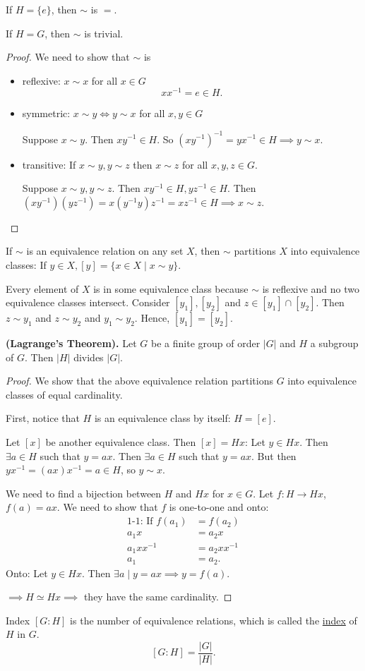 If $H = \{e\}$, then $\sim$ is $=$. 

If $H = G$, then $\sim$ is trivial. 

\begin{proof}
We need to show that $\sim$ is
\begin{itemize}	
\item reflexive: $x\sim x$ for all $x\in G$
\[xx^{-1}=e\in H.\]
\item symmetric: $x\sim y \iff y\sim x$ for all $x, y\in G$

Suppose $x\sim y$. Then $xy^{-1}\in H$. So $(xy^{-1})^{-1}=yx^{-1}\in H\implies y\sim x$. 
\item transitive: If $x\sim y, y\sim z$ then $x\sim z$ for all $x, y, z \in G$. 

Suppose $x\sim y, y\sim z$. Then $xy^{-1}\in H, yz^{-1}\in H$. Then $(xy^{-1})(yz^{-1})=x(y^{-1}y)z^{-1}=xz^{-1}\in H\implies x\sim z$. 
\end{itemize}
\end{proof}

If $\sim$ is an equivalence relation on any set $X$, then $\sim$ partitions $X$ into equivalence classes: 
If $y\in X, [y]=\{x\in X\mid x\sim y\}$. 

Every element of $X$ is in some equivalence class because $\sim$ is reflexive and no two equivalence classes intersect. Consider $[y_1], [y_2]$ and $z\in [y_1]\cap [y_2]$. Then $z\sim y_1$ and $z\sim y_2$ and $y_1\sim y_2$. Hence, $[y_1] = [y_2]$. 

\begin{theorem}
\textbf{(Lagrange's Theorem).} Let $G$ be a finite group of order $|G|$ and $H$ a subgroup of $G$. Then $|H|$ divides $|G|$. 	
\end{theorem}
\begin{proof}
We show that the above equivalence relation partitions $G$ into equivalence classes of equal cardinality. 

First, notice that $H$ is an equivalence class by itself: $H = [e]$. 

Let $[x]$ be another equivalence class. Then $[x]=Hx$: 
Let $y\in Hx$. Then $\exists a\in H$ such that $y=ax$. Then $\exists a\in H$ such that $y=ax$. But then $yx^{-1} = (ax)x^{-1}=a\in H$, so $y\sim x$. 

We need to find a bijection between $H$ and $Hx$ for $x\in G$. Let $f: H\to Hx$, $f(a)=ax$. We need to show that $f$ is one-to-one and onto: 
\begin{align*}
\text{1-1: If } f(a_1) &= f(a_2) \\
	a_1x &= a_2x \\
	a_1xx^{-1} &= a_2xx^{-1} \\
	a_1 &= a_2. 
\end{align*}
Onto: Let $y \in Hx$. Then $\exists a\mid y = ax\implies y = f(a)$. 

$\implies H\simeq Hx\implies$ they have the same cardinality. 

\end{proof}

\begin{defn}{Index}
$[G:H]$ is the number of equivalence relations, which is called the \ul{index} of $H$ in $G$. 
\[[G:H] = \frac{|G|}{|H|}.\]
\end{defn}
